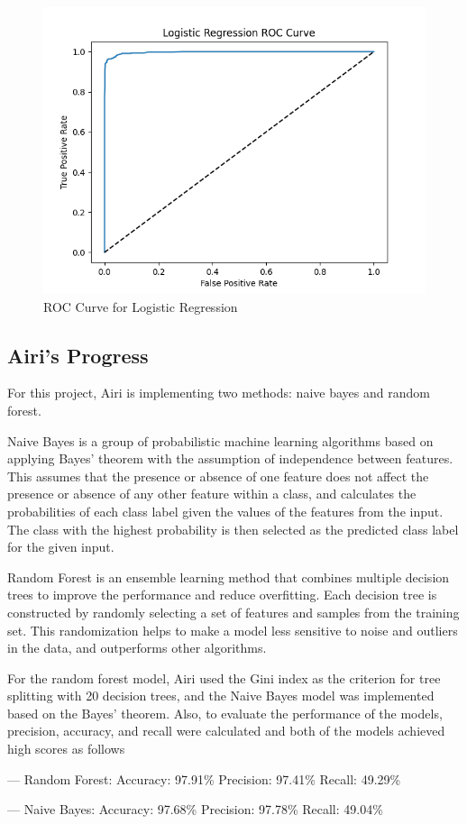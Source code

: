 \begin{figure}[H] %
    \centering
    \includegraphics[width=0.75\linewidth]{LogisticROC.png}
    \caption{ROC Curve for Logistic Regression}
\end{figure}

\subsection{Airi's Progress}

For this project, Airi is implementing two methods: naive bayes and random forest.

Naive Bayes is a group of probabilistic machine learning algorithms based on applying Bayes' theorem with the assumption of independence between features. This assumes that the presence or absence of one feature does not affect the presence or absence of any other feature within a class, and calculates the probabilities of each class label given the values of the features from the input. The class with the highest probability is then selected as the predicted class label for the given input.

Random Forest is an ensemble learning method that combines multiple decision trees to improve the performance and reduce overfitting. Each decision tree is constructed by randomly selecting a set of features and samples from the training set. This randomization helps to make a model less sensitive to noise and outliers in the data, and outperforms other algorithms.

For the random forest model, Airi used the Gini index as the criterion for tree splitting with 20 decision trees, and the Naive Bayes model was implemented based on the Bayes' theorem. Also, to evaluate the performance of the models, precision, accuracy, and recall were calculated and both of the models achieved high scores as follows

— Random Forest:
Accuracy: 97.91\%
Precision: 97.41\% 
Recall: 49.29\%

— Naive Bayes: 
Accuracy:  97.68\%	
Precision: 97.78\% 
Recall: 49.04\% 
